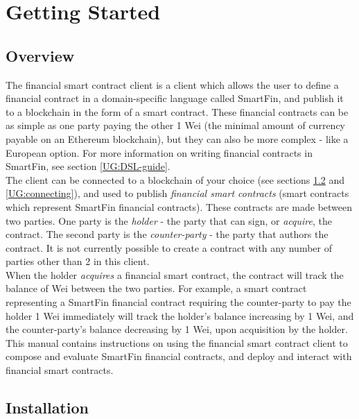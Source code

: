 \section{Getting Started}

\subsection{Overview}

The financial smart contract client is a client which allows the user to define a financial contract in a domain-specific language called SmartFin, and publish it to a blockchain in the form of a smart contract. These financial contracts can be as simple as one party paying the other 1 Wei (the minimal amount of currency payable on an Ethereum blockchain), but they can also be more complex - like a European option. For more information on writing financial contracts in SmartFin, see section \ref{UG:DSL-guide}. \\

The client can be connected to a blockchain of your choice (see sections \ref{UG:installation} and \ref{UG:connecting}), and used to publish \textit{financial smart contracts} (smart contracts which represent SmartFin financial contracts). These contracts are made between two parties. One party is the \textit{holder} - the party that can sign, or \textit{acquire}, the contract. The second party is the \textit{counter-party} - the party that authors the contract. It is not currently possible to create a contract with any number of parties other than 2 in this client. \\

When the holder \textit{acquires} a financial smart contract, the contract will track the balance of Wei between the two parties. For example, a smart contract representing a SmartFin financial contract requiring the counter-party to pay the holder 1 Wei immediately will track the holder's balance increasing by 1 Wei, and the counter-party's balance decreasing by 1 Wei, upon acquisition by the holder. \\

This manual contains instructions on using the financial smart contract client to compose and evaluate SmartFin financial contracts, and deploy and interact with financial smart contracts.


\subsection{Installation} \label{UG:installation}

